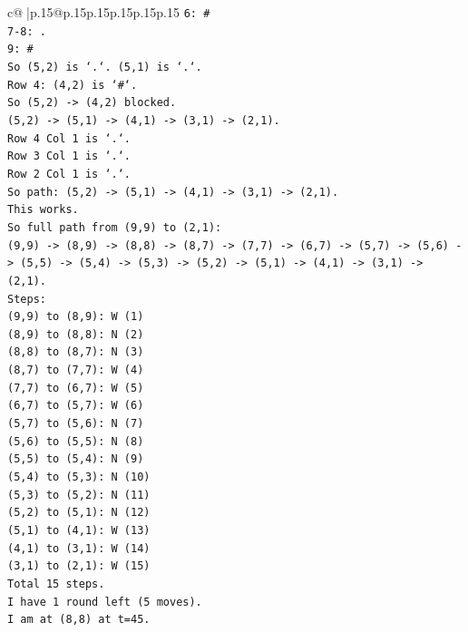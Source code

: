 \documentclass{article}
\begin{document}
{\begin{supertabular}{c@{$\;$}|p{.15\linewidth}@{}p{.15\linewidth}p{.15\linewidth}p{.15\linewidth}p{.15\linewidth}p{.15\linewidth}}
{{{\texttt{6: \#} \\
\texttt{7{-}8: .} \\
\texttt{9: \#} \\
\texttt{So (5,2) is `.`. (5,1) is `.`.} \\
\texttt{Row 4: (4,2) is `\#`.} \\
\texttt{So (5,2) {-}> (4,2) blocked.} \\
\texttt{(5,2) {-}> (5,1) {-}> (4,1) {-}> (3,1) {-}> (2,1).} \\
\texttt{Row 4 Col 1 is `.`.} \\
\texttt{Row 3 Col 1 is `.`.} \\
\texttt{Row 2 Col 1 is `.`.} \\
\texttt{So path: (5,2) {-}> (5,1) {-}> (4,1) {-}> (3,1) {-}> (2,1).} \\
\texttt{This works.} \\
\texttt{So full path from (9,9) to (2,1):} \\
\texttt{(9,9) {-}> (8,9) {-}> (8,8) {-}> (8,7) {-}> (7,7) {-}> (6,7) {-}> (5,7) {-}> (5,6) {-}> (5,5) {-}> (5,4) {-}> (5,3) {-}> (5,2) {-}> (5,1) {-}> (4,1) {-}> (3,1) {-}> (2,1).} \\
\texttt{Steps:} \\
\texttt{(9,9) to (8,9): W (1)} \\
\texttt{(8,9) to (8,8): N (2)} \\
\texttt{(8,8) to (8,7): N (3)} \\
\texttt{(8,7) to (7,7): W (4)} \\
\texttt{(7,7) to (6,7): W (5)} \\
\texttt{(6,7) to (5,7): W (6)} \\
\texttt{(5,7) to (5,6): N (7)} \\
\texttt{(5,6) to (5,5): N (8)} \\
\texttt{(5,5) to (5,4): N (9)} \\
\texttt{(5,4) to (5,3): N (10)} \\
\texttt{(5,3) to (5,2): N (11)} \\
\texttt{(5,2) to (5,1): N (12)} \\
\texttt{(5,1) to (4,1): W (13)} \\
\texttt{(4,1) to (3,1): W (14)} \\
\texttt{(3,1) to (2,1): W (15)} \\
\texttt{Total 15 steps.} \\
\texttt{I have 1 round left (5 moves).} \\
\texttt{I am at (8,8) at t=45.} \\
}}}
\end{supertabular}}
\end{document}
